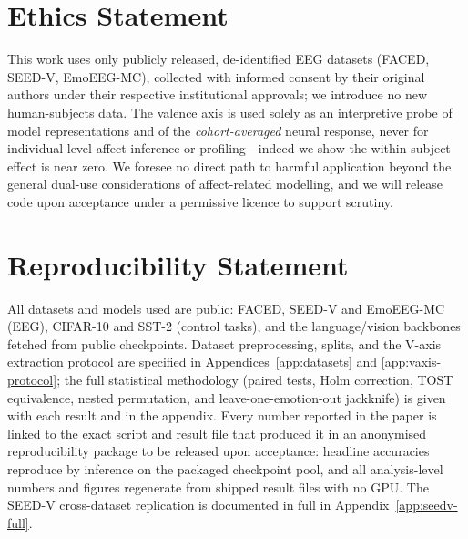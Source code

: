 
\section*{Ethics Statement}
This work uses only publicly released, de-identified EEG datasets (FACED, SEED-V,
EmoEEG-MC), collected with informed consent by their original authors under their
respective institutional approvals; we introduce no new human-subjects data. The
valence axis is used solely as an interpretive probe of model representations and
of the \emph{cohort-averaged} neural response, never for individual-level
affect inference or profiling---indeed we show the within-subject effect is near
zero. We foresee no direct path to harmful application beyond the general dual-use
considerations of affect-related modelling, and we will release code upon acceptance under a permissive
licence to support scrutiny.

\section*{Reproducibility Statement}
All datasets and models used are public: FACED, SEED-V and EmoEEG-MC (EEG),
CIFAR-10 and SST-2 (control tasks), and the language/vision backbones fetched from
public checkpoints. Dataset preprocessing, splits, and the V-axis extraction
protocol are specified in Appendices~\ref{app:datasets} and
\ref{app:vaxis-protocol}; the full statistical methodology (paired tests, Holm
correction, TOST equivalence, nested permutation, and leave-one-emotion-out
jackknife) is given with each result and in the appendix. Every number reported in
the paper is linked to the exact script and result file that produced it in an
anonymised reproducibility package to be released upon acceptance: headline
accuracies reproduce by inference on the packaged checkpoint pool, and all
analysis-level numbers and figures regenerate from shipped result files with no
GPU. The SEED-V cross-dataset replication is documented in full in
Appendix~\ref{app:seedv-full}.
